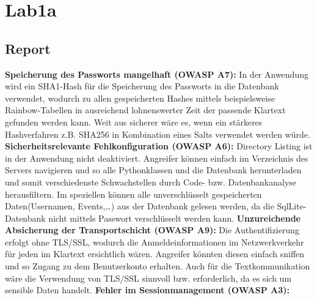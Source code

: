 \documentclass[12pt,a4paper,titlepage,oneside]{scrartcl}
\begin{document}
\maketitle
\setcounter{section}{0}
\setcounter{tocdepth}{2}
\tableofcontents

%
%

\section{Lab1a}

\subsection{Report}
\textbf{Speicherung des Passworts mangelhaft (OWASP A7):}
In der Anwendung wird ein SHA1-Hash f\"ur die Speicherung des Passworts in die Datenbank verwendet, wodurch zu allen gespeicherten Hashes mittels beispielsweise Rainbow-Tabellen in ausreichend lohnenswerter Zeit der passende Klartext gefunden werden kann. Weit aus sicherer wäre es, wenn ein stärkeres Hashverfahren z.B. SHA256 in Kombination eines Salts verwendet werden würde.
\newline
\newline
\textbf{Sicherheitsrelevante Fehlkonfiguration (OWASP A6):}
Directory Listing ist in der Anwendung nicht deaktiviert. Angreifer können einfach im Verzeichnis des Servers navigieren und so alle Pythonklassen und die Datenbank herunterladen und somit verschiedenste Schwachstellen durch Code- bzw. Datenbankanalyse herausfiltern. Im speziellen können alle unverschlüsselt gespeicherten Daten(Usernamen, Events,…) aus der Datenbank gelesen werden, da die SqlLite-Datenbank nicht mittels Passwort verschlüsselt werden kann. 
\newline
\newline
\textbf{Unzureichende Absicherung der Transportschicht (OWASP A9):}
Die Authentifizierung erfolgt ohne TLS/SSL, wodurch die Anmeldeinformationen im Netzwerkverkehr für jeden im Klartext ersichtlich wären. Angreifer könnten diesen einfach sniffen und so Zugang zu dem Benutzerkonto erhalten. Auch für die Textkommunikation wäre die Verwendung von TLS/SSL sinnvoll bzw. erforderlich, da es sich um sensible Daten handelt.
\newline
\newline
\textbf{Fehler im Sessionmanagement (OWASP A3):}
\end{document}
